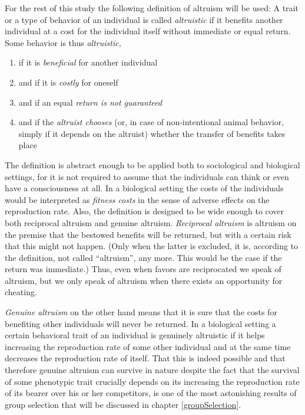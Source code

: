 For the rest of this study the following definition of altruism will be used:
A trait or a type of behavior of an individual is called {\em altruistic} if
it benefits another individual at a cost for the individual itself without
immediate or equal return. Some behavior is thus {\em altruistic},

\begin{enumerate}

\item if it is {\em beneficial} for another individual
\item and if it is {\em costly} for oneself
\item and if an equal {\em return is not guaranteed}
\item and if the {\em altruist chooses} (or, in case of non-intentional animal
behavior, simply if it depends on the altruist) whether the transfer of
benefits takes place

\end{enumerate}

The definition is abstract enough to be applied both to sociological and
biological settings, for it is not required to assume that the individuals can
think or even have a consciousness at all. In a biological setting the costs
of the individuals would be interpreted as {\em fitness costs} in the sense of
adverse effects on the reproduction rate.  Also, the definition is designed to
be wide enough to cover both reciprocal altruism and genuine altruism. {\em
  Reciprocal altruism} is altruism on the premise that the bestowed benefits
will be returned, but with a certain risk that this might not happen. (Only
when the latter is excluded, it is, according to the definition, not called
``altruism'', any more. This would be the case if the return was immediate.)
Thus, even when favors are reciprocated we speak of altruism, but we only
speak of altruism when there exists an opportunity for cheating.

{\em Genuine altruism} on the other hand means that it is sure that the costs
for benefiting other individuals will never be returned. In a biological
setting a certain behavioral trait of an individual is genuinely altruistic if
it helps increasing the reproduction rate of some other individual and at the
same time decreases the reproduction rate of itself. That this is indeed possible
and that therefore genuine altruism can survive in nature despite the fact
that the survival of some phenotypic trait crucially depends on its increasing
the reproduction rate of its bearer over his or her competitors, is one of the
most astonishing results of group selection that will be discussed in chapter
\ref{groupSelection}.


